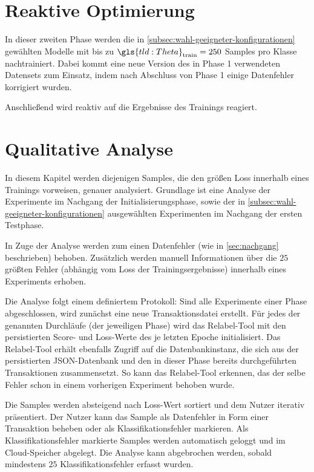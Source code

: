 \section{Reaktive Optimierung}
\label{sec:adjust-overfitting}

In dieser zweiten Phase werden die in \autoref{subsec:wahl-geeigneter-konfigurationen} gewählten Modelle mit bis zu $\gls{tld:Theta}_\text{train} = 250$ Samples pro Klasse nachtrainiert.
Dabei kommt eine neue Version des in Phase 1 verwendeten Datensets zum Einsatz, indem nach Abschluss von Phase 1 einige Datenfehler korrigiert wurden.

Anschließend wird reaktiv auf die Ergebnisse des Trainings reagiert.


\section{Qualitative Analyse}
\label{sec:qualitative-analyse}

In diesem Kapitel werden diejenigen Samples, die den größen Loss innerhalb eines Trainings vorweisen, genauer analysiert.
Grundlage ist eine Analyse der Experimente im Nachgang der Initialisierungsphase, sowie der in \autoref{subsec:wahl-geeigneter-konfigurationen} ausgewählten Experimenten im Nachgang der ersten Testphase.

In Zuge der Analyse werden zum einen Datenfehler (wie in \autoref{sec:nachgang} beschrieben) behoben.
Zusätzlich werden manuell Informationen über die $25$ größten Fehler (abhängig vom Loss der Trainingsergebnisse) innerhalb eines Experiments erhoben.

Die Analyse folgt einem definiertem Protokoll:
Sind alle Experimente einer Phase abgeschlossen, wird zunächst eine neue Transaktionsdatei erstellt.
Für jedes der genannten Durchläufe (der jeweiligen Phase) wird das Relabel-Tool mit den persistierten Score- und Loss-Werte des je letzten Epoche initialisiert.
Das Relabel-Tool erhält ebenfalls Zugriff auf die Datenbankinstanz, die sich aus der persistierten JSON-Datenbank und den in dieser Phase bereits durchgeführten Transaktionen zusammensetzt.
So kann das Relabel-Tool \ua erkennen, das der selbe Fehler schon in einem vorherigen Experiment behoben wurde.

Die Samples werden absteigend nach Loss-Wert sortiert und dem Nutzer iterativ präsentiert.
Der Nutzer kann das Sample als Datenfehler in Form einer Transaktion beheben oder als Klassifikationsfehler markieren.
Als Klassifikationsfehler markierte Samples werden automatisch geloggt und im Cloud-Speicher abgelegt.
Die Analyse kann abgebrochen werden, sobald mindestens $25$ Klassifikationsfehler erfasst wurden.

